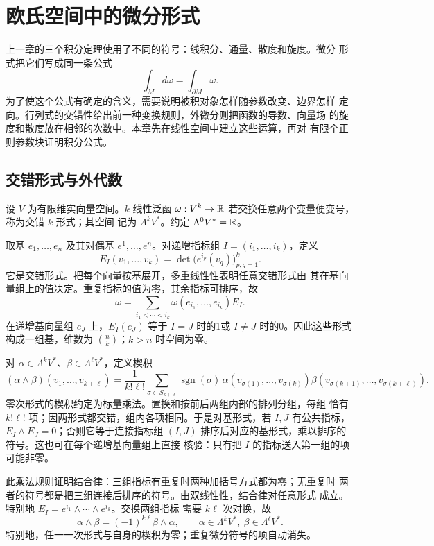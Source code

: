 \chapter{欧氏空间中的微分形式}
\label{chap:differential-forms-euclidean}

上一章的三个积分定理使用了不同的符号：线积分、通量、散度和旋度。微分
形式把它们写成同一条公式
\[
 \int_Md\omega=\int_{\partial M}\omega.
\]
为了使这个公式有确定的含义，需要说明被积对象怎样随参数改变、边界怎样
定向。行列式的交错性给出前一种变换规则，外微分则把函数的导数、向量场
的旋度和散度放在相邻的次数中。本章先在线性空间中建立这些运算，再对
有限个正则参数块证明积分公式。

\section{交错形式与外代数}

设 $V$ 为有限维实向量空间。$k$-线性泛函
$\omega:V^k\to\mathbb{R}$ 若交换任意两个变量便变号，称为交错 $k$-形式；其空间
记为 $\Lambda^kV^*$。约定 $\Lambda^0V^*=\mathbb{R}$。

取基 $e_1,\ldots,e_n$ 及其对偶基 $e^1,\ldots,e^n$。对递增指标组
$I=(i_1,\ldots,i_k)$，定义
\[
 E_I(v_1,\ldots,v_k)=\det\bigl(e^{i_p}(v_q)\bigr)_{p,q=1}^k.
\]
它是交错形式。把每个向量按基展开，多重线性性表明任意交错形式由
其在基向量组上的值决定。重复指标的值为零，其余指标可排序，故
\[
 \omega=\sum_{i_1<\cdots<i_k}
 \omega(e_{i_1},\ldots,e_{i_k})E_I.
\]
在递增基向量组 $e_J$ 上，$E_I(e_J)$ 等于 $I=J$ 时的1或 $I\ne J$
时的0。因此这些形式构成一组基，维数为 $\binom nk$；$k>n$ 时空间为零。

对 $\alpha\in\Lambda^kV^*$、$\beta\in\Lambda^\ell V^*$，定义楔积
\[
 (\alpha\wedge\beta)(v_1,\ldots,v_{k+\ell})
 =\frac1{k!\ell!}\sum_{\sigma\in S_{k+\ell}}
 \operatorname{sgn}(\sigma)\,
 \alpha(v_{\sigma(1)},\ldots,v_{\sigma(k)})
 \beta(v_{\sigma(k+1)},\ldots,v_{\sigma(k+\ell)}).
\]
零次形式的楔积约定为标量乘法。置换和按前后两组内部的排列分组，每组
恰有 $k!\ell!$ 项；因两形式都交错，组内各项相同。于是对基形式，若
$I,J$ 有公共指标，$E_I\wedge E_J=0$；否则它等于连接指标组 $(I,J)$
排序后对应的基形式，乘以排序的符号。这也可在每个递增基向量组上直接
核验：只有把 $I$ 的指标送入第一组的项可能非零。

此乘法规则证明结合律：三组指标有重复时两种加括号方式都为零；无重复时
两者的符号都是把三组连接后排序的符号。由双线性性，结合律对任意形式
成立。特别地 $E_I=e^{i_1}\wedge\cdots\wedge e^{i_k}$。交换两组指标
需要 $k\ell$ 次对换，故
\[
 \alpha\wedge\beta=(-1)^{k\ell}\beta\wedge\alpha,
 \qquad \alpha\in\Lambda^kV^*,\ \beta\in\Lambda^\ell V^*.
\]
特别地，任一一次形式与自身的楔积为零；重复微分符号的项自动消失。

